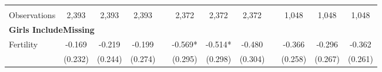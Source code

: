 \begin{landscape}
\begin{table}[htpb!]
\begin{center}
\begin{tabular}{lcccp{2mm}cccp{2mm}ccc}
\begin{footnotesize}\end{footnotesize}&\begin{footnotesize}\end{footnotesize}&\begin{footnotesize}\end{footnotesize}&\begin{footnotesize}\end{footnotesize}&\begin{footnotesize}\end{footnotesize}&\begin{footnotesize}\end{footnotesize}&\begin{footnotesize}\end{footnotesize}&\begin{footnotesize}\end{footnotesize}&\begin{footnotesize}\end{footnotesize}&\begin{footnotesize}\end{footnotesize}&\begin{footnotesize}\end{footnotesize}&\begin{footnotesize}\end{footnotesize}\\Observations&2,393&2,393&2,393&&2,372&2,372&2,372&&1,048&1,048&1,048\\
\multicolumn{12}{l}{\textbf{Girls IncludeMissing}}\\ 
Fertility&-0.169&-0.219&-0.199&&-0.569*&-0.514*&-0.480&&-0.366&-0.296&-0.362\\
&(0.232)&(0.244)&(0.274)&&(0.295)&(0.298)&(0.304)&&(0.258)&(0.267)&(0.261)\\

\end{tabular}
\end{center}
\end{table}
\end{landscape}

